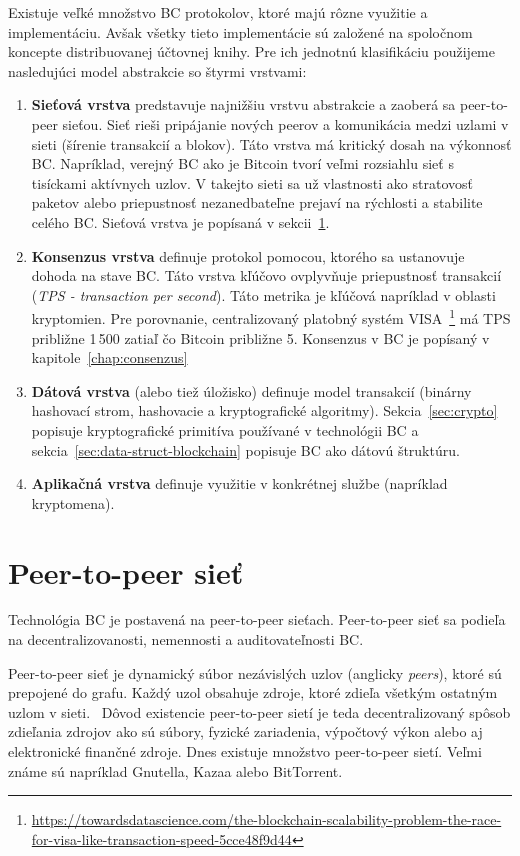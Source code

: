 Existuje veľké množstvo BC protokolov, ktoré majú rôzne využitie a implementáciu. Avšak všetky tieto implementácie sú založené na spoločnom koncepte distribuovanej účtovnej knihy. Pre ich jednotnú klasifikáciu použijeme nasledujúci model abstrakcie so štyrmi vrstvami:~\cite{homoliakBlockchain}

\begin{enumerate}
	\item \textbf{Sieťová vrstva} predstavuje najnižšiu vrstvu abstrakcie a zaoberá sa peer-to-peer sieťou. Sieť rieši pripájanie nových peerov a komunikácia medzi uzlami v sieti (šírenie transakcií a blokov). Táto vrstva má kritický dosah na výkonnosť BC. Napríklad, verejný BC ako je Bitcoin tvorí veľmi rozsiahlu sieť s tisíckami aktívnych uzlov. V takejto sieti sa už vlastnosti ako stratovosť paketov alebo priepustnosť nezanedbateľne prejaví na rýchlosti a stabilite celého BC. Sieťová vrstva je popísaná v sekcii~\ref{sec:p2p}.~\cite{fanPerfEval}
	\item \textbf{Konsenzus vrstva} definuje protokol pomocou, ktorého sa ustanovuje dohoda na stave BC. Táto vrstva kľúčovo ovplyvňuje priepustnosť transakcií (\textit{TPS - transaction per second}). Táto metrika je kľúčová napríklad v oblasti kryptomien. Pre porovnanie, centralizovaný platobný systém VISA~\footnote{\url{https://towardsdatascience.com/the-blockchain-scalability-problem-the-race-for-visa-like-transaction-speed-5cce48f9d44}} má TPS približne 1\,500 zatiaľ čo Bitcoin približne 5. Konsenzus v BC je popísaný v kapitole~\ref{chap:consenzus}
	\item \textbf{Dátová vrstva} (alebo tiež úložisko) definuje model transakcií (binárny hashovací strom, hashovacie a kryptografické algoritmy). Sekcia~\ref{sec:crypto} popisuje kryptografické primitíva používané v technológii BC a sekcia~\ref{sec:data-struct-blockchain} popisuje BC ako dátovú štruktúru.
	\item \textbf{Aplikačná vrstva} definuje využitie v konkrétnej službe (napríklad kryptomena).
\end{enumerate}

\section{Peer-to-peer sieť}\label{sec:p2p}

Technológia BC je postavená na peer-to-peer sieťach. Peer-to-peer sieť sa podieľa na decentralizovanosti, nemennosti a auditovateľnosti BC. 

Peer-to-peer sieť je dynamický súbor nezávislých uzlov (anglicky \textit{peers}), ktoré sú prepojené do grafu. Každý uzol obsahuje zdroje, ktoré zdieľa všetkým ostatným uzlom v sieti.~\cite{p2pBuford, p2pSchollmeier} Dôvod existencie peer-to-peer sietí je teda decentralizovaný spôsob zdieľania zdrojov ako sú súbory, fyzické zariadenia, výpočtový výkon alebo aj elektronické finančné zdroje. Dnes existuje množstvo peer-to-peer sietí. Veľmi známe sú napríklad Gnutella, Kazaa alebo BitTorrent.~\cite{p2pEssence}

